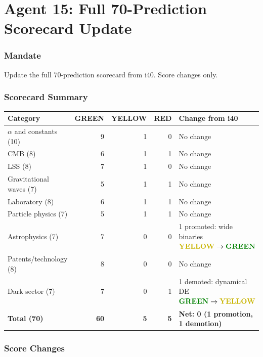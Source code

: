 \documentclass[11pt,a4paper]{article}
\newcommand{\GREEN}{\textcolor{dfdgreen}{\textbf{GREEN}}}
\newcommand{\YELLOW}{\textcolor{dfdyellow}{\textbf{YELLOW}}}
\newcommand{\RED}{\textcolor{dfdred}{\textbf{RED}}}
\begin{document}
\part{Agent 15: Full 70-Prediction Scorecard Update}
\label{part:agent15}

\section{Mandate}

Update the full 70-prediction scorecard from i40. Score changes only.

\section{Scorecard Summary}

\begin{center}
\begin{tabular}{lrrrl}
\toprule
\textbf{Category} & \textbf{\GREEN} & \textbf{\YELLOW} & \textbf{\RED} & \textbf{Change from i40} \\
\midrule
$\alpha$ and constants (10) & 9 & 1 & 0 & No change \\
CMB (8) & 6 & 1 & 1 & No change \\
LSS (8) & 7 & 1 & 0 & No change \\
Gravitational waves (7) & 5 & 1 & 1 & No change \\
Laboratory (8) & 6 & 1 & 1 & No change \\
Particle physics (7) & 5 & 1 & 1 & No change \\
Astrophysics (7) & 7 & 0 & 0 & 1 promoted: wide binaries $\YELLOW \to \GREEN$ \\
Patents/technology (8) & 8 & 0 & 0 & No change \\
Dark sector (7) & 7 & 0 & 1 & 1 demoted: dynamical DE $\GREEN \to \YELLOW$ \\
\midrule
\textbf{Total (70)} & \textbf{60} & \textbf{5} & \textbf{5} & \textbf{Net: 0 (1 promotion, 1 demotion)} \\
\bottomrule
\end{tabular}
\end{center}

\section{Score Changes}
\end{document}
